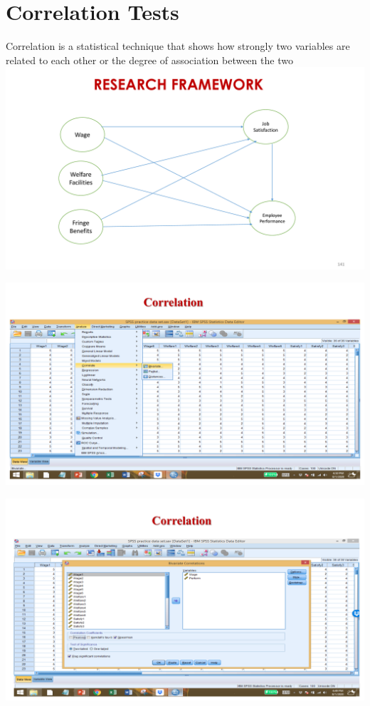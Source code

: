 \documentclass[
  letterpaper,
  DIV=11,
  numbers=noendperiod]{scrreprt}
\begin{document}
\chapter{Correlation Tests}\label{correlation-tests}

Correlation is a statistical technique that shows how strongly two
variables are related to each other or the degree of association between
the two\\

\includegraphics{images/slides/img_Page_130.png}

\includegraphics{images/slides/img_Page_131.png}

\includegraphics{images/slides/img_Page_132.png}
\end{document}
